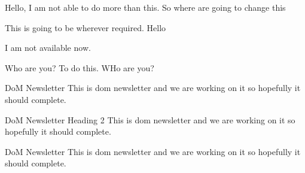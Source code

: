 \documentclass{article}
\begin{document}
Hello, I am not able to do more than this. So where are going to change this

This is going to be wherever required. Hello

I am not available now.

Who are you? To do this. WHo are you?

DoM Newsletter
This is dom newsletter  and we are working on it so hopefully it should complete.

DoM Newsletter Heading 2
This is dom newsletter  and we are working on it so hopefully it should complete.

DoM Newsletter
This is dom newsletter  and we are working on it so hopefully it should complete.
\end{document}
